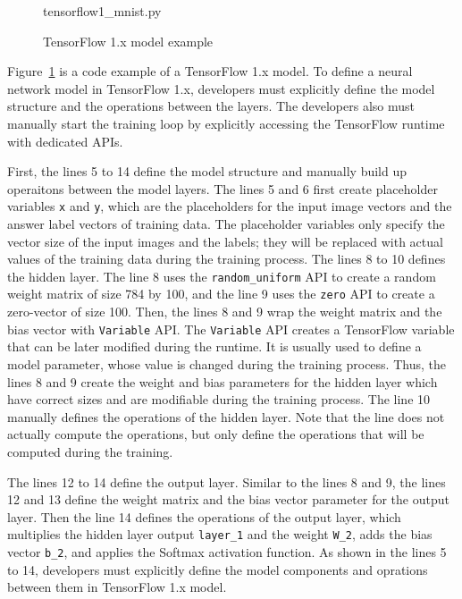 \begin{figure}[ht!]

{tensorflow1_mnist.py}
  \caption{TensorFlow 1.x model example}
\label{fig:back:tf1}
\end{figure}

Figure~\ref{fig:back:tf1} is a code example of a TensorFlow 1.x model.
To define a neural network model in TensorFlow 1.x, 
developers must explicitly define the model structure
and the operations between the layers. 
The developers also must manually start the training loop by explicitly
accessing the TensorFlow runtime with dedicated APIs.

First, the lines 5 to 14 define the model structure and manually build up
operaitons between the model layers.
The lines 5 and 6 first create placeholder variables {\tt x} and {\tt y},
which are the placeholders for the input image vectors 
and the answer label vectors of training data.
The placeholder variables only specify the vector size of the input images
and the labels; they will be replaced with actual values of the training
data during the training process. 
The lines 8 to 10 defines the hidden layer.
The line 8 uses the {\tt random\_uniform} API to create 
a random weight matrix of size 784 by 100, 
and the line 9 uses the {\tt zero} API to create a zero-vector of size 100.
Then, the lines 8 and 9 wrap the weight matrix and the bias vector with
{\tt Variable} API.
The {\tt Variable} API creates a TensorFlow variable that can be later modified
during the runtime. It is usually used to define a model 
parameter, whose value is changed during the training process.
Thus, the lines 8 and 9 create the weight and bias parameters for the
hidden layer which have correct sizes and are modifiable during the 
training process.
The line 10 manually defines the operations of the hidden layer. 
Note that the line does not actually compute the operations,
but only define the operations that will be computed during the training.

The lines 12 to 14 define the output layer.
Similar to the lines 8 and 9, the lines 12 and 13 define the weight matrix
and the bias vector parameter for the output layer.
Then the line 14 defines the operations of the output layer,
which multiplies the hidden layer output {\tt layer\_1} and
the weight {\tt W\_2}, adds the bias vector {\tt b\_2}, and applies the
Softmax activation function.
As shown in the lines 5 to 14, developers must explicitly define
the model components and oprations between them in TensorFlow 1.x model.


